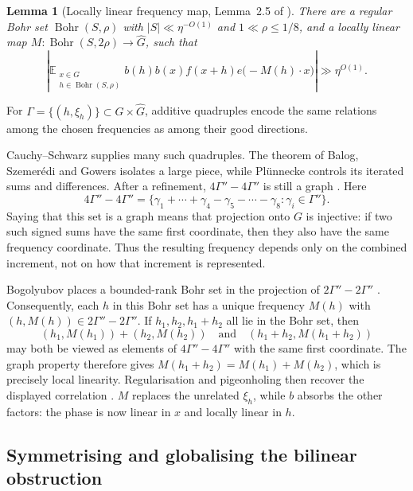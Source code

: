 \documentclass[12pt]{article}
\newtheorem{lemma}[theorem]{Lemma}
\begin{document}
\begin{lemma}[Locally linear frequency map, Lemma~2.5 of
\cite{JamneshanTaoFE}]\label{lem:frequency-mapFE}
There are a regular Bohr set $\operatorname{Bohr}(S,\rho)$ with
$|S|\ll\eta^{-O(1)}$ and $1\ll\rho\leq1/8$, and a locally linear map
$M:\operatorname{Bohr}(S,2\rho)\to\widehat G$, such that
\[
 \left|
 \mathbb{E}_{\substack{x\in G\\h\in\operatorname{Bohr}(S,\rho)}}
 b(h)b(x)f(x+h)e\bigl(-M(h)\cdot x\bigr)
 \right|
 \gg\eta^{O(1)}.
\]
\end{lemma}

For $\Gamma=\{(h,\xi_h)\}\subset G\times\widehat G$, additive quadruples
encode the same relations among the chosen frequencies as among their good
directions.

Cauchy--Schwarz supplies many such quadruples.  The theorem of Balog,
Szemer\'edi and Gowers isolates a large piece, while Pl\"unnecke controls its
iterated sums and differences.  After a refinement,
$4\Gamma''-4\Gamma''$ is still a graph
\cite[Propositions~5.1, 5.4, and~9.1]{GreenTaoFE}.  Here
\[
 4\Gamma''-4\Gamma''
 =\{\gamma_1+\cdots+\gamma_4-\gamma_5-\cdots-\gamma_8:
     \gamma_i\in\Gamma''\}.
\]
Saying that this set is a graph means that projection onto $G$ is injective:
if two such signed sums have the same first coordinate, then they also have
the same frequency coordinate.  Thus the resulting frequency depends only
on the combined increment, not on how that increment is represented.

Bogolyubov places a bounded-rank Bohr set in the projection of
$2\Gamma''-2\Gamma''$ \cite[Lemma~6.3]{GreenTaoFE}.  Consequently, each $h$
in this Bohr set has a unique frequency $M(h)$ with
$(h,M(h))\in2\Gamma''-2\Gamma''$.  If $h_1,h_2,h_1+h_2$ all lie in the Bohr
set, then
\[
 (h_1,M(h_1))+(h_2,M(h_2))
 \quad\text{and}\quad
 (h_1+h_2,M(h_1+h_2))
\]
may both be viewed as elements of $4\Gamma''-4\Gamma''$ with the same first
coordinate.  The graph property therefore gives
$M(h_1+h_2)=M(h_1)+M(h_2)$, which is precisely local linearity.
Regularisation and pigeonholing then recover the displayed correlation
\cite[Proposition~9.3]{GreenTaoFE}.
$M$ replaces the unrelated $\xi_h$, while $b$ absorbs the other factors:
the phase is now linear in $x$ and locally linear in $h$.

\subsection{Symmetrising and globalising the bilinear obstruction}
\label{sec:lemma-2-6FE}
\end{document}
